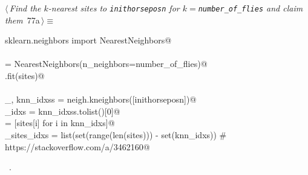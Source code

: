\documentclass[11.5pt]{report}
\begin{document}
\begin{flushleft} \small\label{scrap114}\raggedright\small
{} $\langle\,${\itshape Find the $k$-nearest sites to \verb|inithorseposn| for $k=$\verb|number_of_flies| and claim them}\nobreak\ {\footnotesize {77a}}$\,\rangle\equiv$
\vspace{-1ex}
\begin{list}{}{} \item
\mbox{}\verb@from sklearn.neighbors import NearestNeighbors@\\
\mbox{}\verb@@\\
\mbox{}\verb@neigh = NearestNeighbors(n_neighbors=number_of_flies)@\\
\mbox{}\verb@neigh.fit(sites)@\\
\mbox{}\verb@@\\
\mbox{}\verb@_, knn_idxss = neigh.kneighbors([inithorseposn])@\\
\mbox{}\verb@knn_idxs     = knn_idxss.tolist()[0]@\\
\mbox{}\verb@knns         = [sites[i] for i in knn_idxs]@\\
\mbox{}\verb@unclaimed_sites_idxs = list(set(range(len(sites))) - set(knn_idxs)) # https://stackoverflow.com/a/3462160@\\
\mbox{}\verb@@{\NWsep}
\end{list}
\vspace{-1.5ex}
\footnotesize
\begin{list}{}{\setlength{\itemsep}{-\parsep}\setlength{\itemindent}{-\leftmargin}}
\item \NWtxtMacroRefIn\ .

\item{}
\end{list}
\vspace{4ex}
\end{flushleft}
\end{document}
